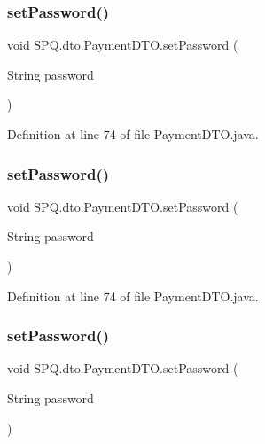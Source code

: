 \subsubsection{\texorpdfstring{set\+Password()}{setPassword()}\hspace{0.1cm}{\footnotesize\ttfamily [1/3]}}
{\footnotesize\ttfamily void S\+P\+Q.\+dto.\+Payment\+D\+T\+O.\+set\+Password (\begin{DoxyParamCaption}\item[{String}]{password }\end{DoxyParamCaption})}



Definition at line 74 of file Payment\+D\+T\+O.\+java.

\mbox{\label{class_s_p_q_1_1dto_1_1_payment_d_t_o_a51a5daa487df2578ca39ede7ae705fb6}} 
\subsubsection{\texorpdfstring{set\+Password()}{setPassword()}\hspace{0.1cm}{\footnotesize\ttfamily [2/3]}}
{\footnotesize\ttfamily void S\+P\+Q.\+dto.\+Payment\+D\+T\+O.\+set\+Password (\begin{DoxyParamCaption}\item[{String}]{password }\end{DoxyParamCaption})}



Definition at line 74 of file Payment\+D\+T\+O.\+java.

\mbox{\label{class_s_p_q_1_1dto_1_1_payment_d_t_o_a51a5daa487df2578ca39ede7ae705fb6}} 
\subsubsection{\texorpdfstring{set\+Password()}{setPassword()}\hspace{0.1cm}{\footnotesize\ttfamily [3/3]}}
{\footnotesize\ttfamily void S\+P\+Q.\+dto.\+Payment\+D\+T\+O.\+set\+Password (\begin{DoxyParamCaption}\item[{String}]{password }\end{DoxyParamCaption})}



